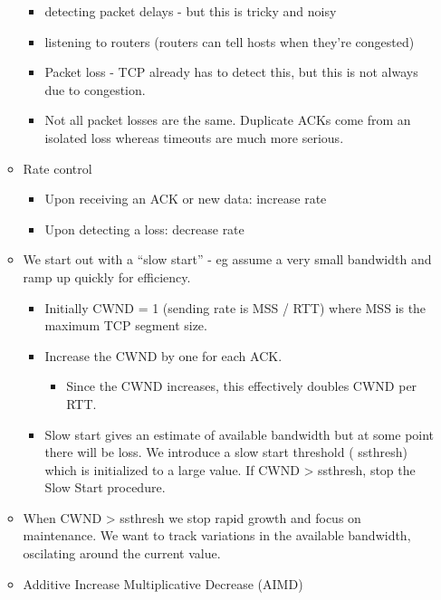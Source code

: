 \documentclass[]{article}
\providecommand{\tightlist}{%
  \setlength{\itemsep}{0pt}\setlength{\parskip}{0pt}}
\begin{document}
\begin{itemize}
\begin{itemize}
    \begin{itemize}
    \tightlist
    \item
      detecting packet delays - but this is tricky and noisy
    \item
      listening to routers (routers can tell hosts when they're
      congested)
    \item
      Packet loss - TCP already has to detect this, but this is not
      always due to congestion.
    \item
      Not all packet losses are the same. Duplicate ACKs come from an
      isolated loss whereas timeouts are much more serious.
    \end{itemize}
  \item
    Rate control

    \begin{itemize}
    \tightlist
    \item
      Upon receiving an ACK or new data: increase rate
    \item
      Upon detecting a loss: decrease rate
    \end{itemize}
  \item
    We start out with a ``slow start'' - eg assume a very small
    bandwidth and ramp up quickly for efficiency.

    \begin{itemize}
    \tightlist
    \item
      Initially CWND = 1 (sending rate is MSS / RTT) where MSS is the
      maximum TCP segment size.
    \item
      Increase the CWND by one for each ACK.

      \begin{itemize}
      \tightlist
      \item
        Since the CWND increases, this effectively doubles CWND per RTT.
      \end{itemize}
    \item
      Slow start gives an estimate of available bandwidth but at some
      point there will be loss. We introduce a slow start threshold (
      ssthresh) which is initialized to a large value. If CWND
      \textgreater{} ssthresh, stop the Slow Start procedure.
    \end{itemize}
  \item
    When CWND \textgreater{} ssthresh we stop rapid growth and focus on
    maintenance. We want to track variations in the available bandwidth,
    oscilating around the current value.
  \item
    Additive Increase Multiplicative Decrease (AIMD)


\end{itemize}
\end{itemize}
\end{document}
